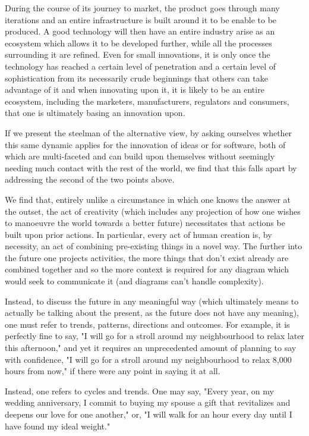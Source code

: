 \documentclass{article}
\begin{document}
During the course of its journey to market, the product goes through many iterations and an entire infrastructure is built around it to be enable to be produced. A good technology will then have an entire industry arise as an ecosystem which allows it to be developed further, while all the processes surrounding it are refined. Even for small innovations, it is only once the technology has reached a certain level of penetration and a certain level of sophistication from its necessarily crude beginnings that others can take advantage of it and when innovating upon it, it is likely to be an entire ecosystem, including the marketers, manufacturers, regulators and consumers, that one is ultimately basing an innovation upon.

If we present the steelman of the alternative view, by asking ourselves whether this same dynamic applies for the innovation of ideas or for software, both of which are multi-faceted and can build upon themselves without seemingly needing much contact with the rest of the world, we find that this falls apart by addressing the second of the two points above.

We find that, entirely unlike a circumstance in which one knows the answer at the outset, the act of creativity (which includes any projection of how one wishes to manoeuvre the world towards a better future) necessitates that actions be built upon prior actions. In particular, every act of human creation is, by necessity, an act of combining pre-existing things in a novel way. The further into the future one projects activities, the more things that don't exist already are combined together and so the more context is required for any diagram which would seek to communicate it (and diagrams can't handle complexity).

Instead, to discuss the future in any meaningful way (which ultimately means to actually be talking about the present, as the future does not have any meaning), one must refer to trends, patterns, directions and outcomes. For example, it is perfectly fine to say, "I will go for a stroll around my neighbourhood to relax later this afternoon," and yet it requires an unprecedented amount of planning to say with confidence, "I will go for a stroll around my neighbourhood to relax 8,000 hours from now," if there were any point in saying it at all.

Instead, one refers to cycles and trends. One may say, "Every year, on my wedding anniversary, I commit to buying my spouse a gift that revitalizes and deepens our love for one another," or, "I will walk for an hour every day until I have found my ideal weight."
\end{document}
